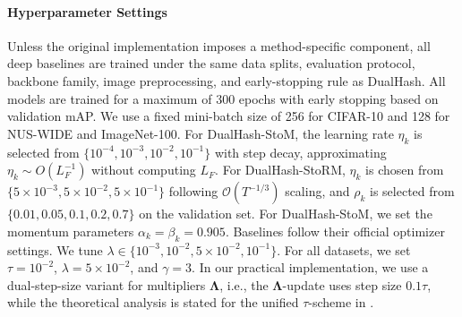\paragraph{Hyperparameter Settings}
\label{Paragraph: Hyperparameter Settings}
{Unless the original implementation imposes a method-specific component, all deep baselines are trained under the same data splits, evaluation protocol, backbone family, image preprocessing, and early-stopping rule as DualHash.} All models are trained for a maximum of 300 epochs with early stopping based on validation mAP. We use a fixed mini-batch size of 256 for CIFAR-10 and 128 for NUS-WIDE and ImageNet-100.
For DualHash-StoM, the learning rate $\eta_k$ is selected from $\{10^{-4}, 10^{-3}, 10^{-2}, 10^{-1}\}$ with step decay, approximating $\eta_k \sim O(L_F^{-1})$ without computing $L_F$. For DualHash-StoRM, $\eta_k$ is chosen from $\{5 \times 10^{-3}, 5 \times 10^{-2}, 5 \times 10^{-1}\}$ following $\mathcal{O}(T^{-1/3})$ scaling, and $\rho_k$ is selected from $\{0.01, 0.05, 0.1, 0.2, 0.7\}$ on the validation set. For DualHash-StoM, we set the momentum parameters $\alpha_k = \beta_k = 0.905$. Baselines follow their official optimizer settings. We tune $\lambda \in \{10^{-3}, 10^{-2}, 5\times 10^{-2}, 10^{-1}\}$. For all datasets, we set $\tau = 10^{-2}$, $\lambda = 5 \times 10^{-2}$, and $\gamma = 3$. In our practical implementation, we use a dual-step-size variant for multipliers \(\bm{\Lambda}\), i.e., the \(\bm{\Lambda}\)-update uses step size \(0.1\tau\), while the theoretical analysis is stated for the unified \(\tau\)-scheme in . 
